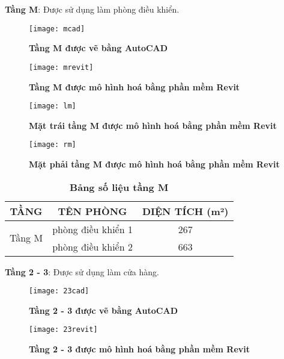 \newpage
\textbf{Tầng M}: Được sử dụng làm phòng điều khiển.

\begin{figure}[H]
	\centering
	\texttt{[image: mcad]}
	\caption{\textbf{Tầng M được vẽ bằng AutoCAD}}
	\label{mcad}
\end{figure}

\begin{figure}[H]
	\centering
	\texttt{[image: mrevit]}
	\caption{\textbf{Tầng M được mô hình hoá bằng phần mềm Revit}}
	\label{mrevit}
\end{figure} 

\begin{figure}[H]
	\centering
	\texttt{[image: lm]}
	\caption{\textbf{Mặt trái tầng M được mô hình hoá bằng phần mềm Revit}}
	\label{lm}
\end{figure} 

\begin{figure}[H]
	\centering
	\texttt{[image: rm]}
	\caption{\textbf{Mặt phải tầng M được mô hình hoá bằng phần mềm Revit}}
	\label{rm}
\end{figure} 

\begin{table}[H]
	\centering
	\caption{\textbf{Bảng số liệu tầng M}}
\begin{tabular}{|c|c|c|}
	\hline
	TẦNG & \multicolumn{1}{c|}{TÊN PHÒNG} & \multicolumn{1}{c|}{DIỆN TÍCH (m²) } \bigstrut\\
	\hline
	\multirow{2}[4]{*}{Tầng M} & phòng điều khiển 1 & 267 \bigstrut\\
	\cline{2-3}      & phòng điều khiển 2 & 663 \bigstrut\\
	\hline
\end{tabular}%
 \label{table:bảng số liệu tầng M}
\end{table}

\newpage
\textbf{Tầng 2 - 3}: Được sử dụng làm cửa hàng.

\begin{figure}[H]
	\centering
	\texttt{[image: 23cad]}
	\caption{\textbf{Tầng 2 - 3 được vẽ bằng AutoCAD}}
	\label{23cad}
\end{figure}

\begin{figure}[H]
	\centering
	\texttt{[image: 23revit]}
	\caption{\textbf{Tầng 2 - 3 được mô hình hoá bằng phần mềm Revit}}
	\label{23revit}
\end{figure} 

